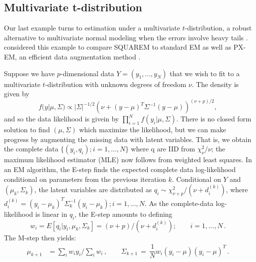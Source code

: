 \documentclass{statsoc}
\begin{document}
 


 \subsection{Multivariate t-distribution} \label{ex:multi.t.distr}
 
 Our last example turns to estimation under a multivariate $t$-distribution, a robust alternative to  multivariate normal modeling when the errors involve heavy tails \citep{lange1989robust}.  %
 \cite{varadhan2008simple} considered this example to compare SQUAREM to standard EM as well as PX-EM, an efficient data augmentation method  \citep{meng1997algorithm}. %
 
 Suppose we have $p$-dimensional data $Y = (y_1, ..., y_N)$ that we wish to fit to a multivariate $t$-distribution with unknown degrees of freedom $\nu$. The density is given by 
 \[
 f(y| \mu, \Sigma) \propto | \Sigma |^{-1/2} \left(\nu + (y - \mu)^T \Sigma^{-1} (y - \mu)\right)^{(\nu + p)/2},
 \]
and so the data likelihood is givein by $\prod_{i=1}^{N}f(y_i | \mu, \Sigma)$. There is no closed form solution to find $(\mu, \Sigma)$ which maximize the likelihood, but we can make progress by augmenting the missing data with latent variables. That is, we obtain the complete data $\{(y_i, q_i); i = 1, ..., N\}$ where q are IID from $\chi^2_\nu / \nu$;  the maximum likelihood estimator (MLE) now follows from weighted least squares. In an EM algorithm, the E-step finds the expected complete data log-likelihood conditional on parameters from the previous iteration $k$. %
Conditional on $Y$ and $(\mu_k, \Sigma_k)$, the latent variables are distributed as $q_i \sim \chi^2_{\nu +p}/(\nu + d_i^{(k)})$, where $d_i^{(k)} = (y_i - \mu_k)^T \Sigma_k^{-1} (y_i - \mu_k); i= 1,..., N$. As the complete-data log-likelihood is linear in $q_i$, the E-step amounts to defining
 \[
 w_i = E[q_i | y_i, \mu_k, \Sigma_k] = (\nu + p)/(\nu + d_i^{(k)}); \qquad i = 1, ..., N\,.
 \]
 The M-step then yields:
 \begin{align*}
     \mu_{k+1} &=\sum_{i}w_i y_i \bigg / \sum_{i}w_i\,, \qquad \Sigma_{k+1} \,=\, \dfrac{1}{N} w_i (y_i - \mu)(y_i - \mu)^T\,.
 \end{align*}
 
\end{document}

